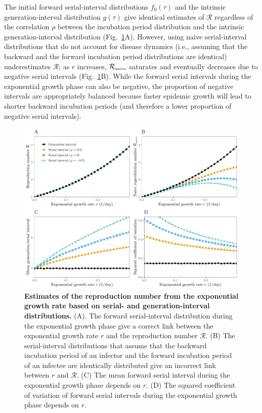 \documentclass[12pt]{article}
\newcommand{\fref}[1]{Fig.~\ref{fig:#1}}
\begin{document}
The initial forward serial-interval distributions $f_0(\tau)$ and the intrinsic generation-interval distribution $g(\tau)$ give identical estimates of $\mathcal R$ regardless of the correlation $\rho$ between the incubation period distribution and the intrinsic generation-interval distribution (\fref{rR}A).
However, using naive serial-interval distributions that do not account for disease dynamics (i.e., assuming that the backward and the forward incubation period distributions are identical) underestimates $\mathcal R$;
as $r$ increases, ${\mathcal R}_{\textrm{\tiny naive}}$ saturates and eventually decreases due to negative serial intervals (\fref{rR}B).
While the forward serial intervals during the exponential growth phase can also be negative, the proportion of negative intervals are appropriately balanced because faster epidemic growth will lead to shorter backward incubation periods (and therefore a lower proportion of negative serial intervals).

\begin{figure}[!th]
\includegraphics[width=\textwidth]{rR.pdf}
\caption{
\textbf{Estimates of the reproduction number from the exponential growth rate based on serial- and generation-interval distributions.}
(A). The forward serial-interval distribution during the exponential growth phase give a correct link between the exponential growth rate $r$ and the reproduction number $\mathcal R$.
(B) The serial-interval distributions that assume that the backward incubation period of an infector and the forward incubation period of an infectee are identically distributed give an incorrect link between $r$ and $\mathcal R$.
(C) The mean forward serial interval during the exponential growth phase depends on $r$.
(D) The squared coefficient of variation of forward serial intervals during the exponential growth phase depends on $r$.
}
\label{fig:rR}
\end{figure}
\end{document}
